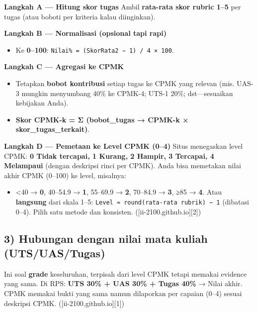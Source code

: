 \documentclass[
  letterpaper,
  DIV=11,
  numbers=noendperiod]{scrreprt}
\providecommand{\tightlist}{%
  \setlength{\itemsep}{0pt}\setlength{\parskip}{0pt}}
\begin{document}
\textbf{Langkah A --- Hitung skor tugas} Ambil \textbf{rata-rata skor
rubric 1--5} per tugas (atau boboti per kriteria kalau diinginkan).

\textbf{Langkah B --- Normalisasi (opsional tapi rapi)}

\begin{itemize}
\tightlist
\item
  Ke \textbf{0--100}:
  \texttt{Nilai\%\ =\ (SkorRata2\ −\ 1)\ /\ 4\ ×\ 100}.
\end{itemize}

\textbf{Langkah C --- Agregasi ke CPMK}

\begin{itemize}
\tightlist
\item
  Tetapkan \textbf{bobot kontribusi} setiap tugas ke CPMK yang relevan
  (mis. UAS-3 mungkin menyumbang 40\% ke CPMK-4; UTS-1 20\%;
  dst---sesuaikan kebijakan Anda).
\item
  \textbf{Skor CPMK-k = Σ (bobot\_tugas → CPMK-k ×
  skor\_tugas\_terkait)}.
\end{itemize}

\textbf{Langkah D --- Pemetaan ke Level CPMK (0--4)} Situs menegaskan
level CPMK: \textbf{0 Tidak tercapai, 1 Kurang, 2 Hampir, 3 Tercapai, 4
Melampaui} (dengan deskripsi rinci per CPMK). Anda bisa memetakan nilai
akhir CPMK (0--100) ke level, misalnya:

\begin{itemize}
\tightlist
\item
  \textless40 → \textbf{0}, 40--54.9 → \textbf{1}, 55--69.9 →
  \textbf{2}, 70--84.9 → \textbf{3}, ≥85 → \textbf{4}. Atau
  \textbf{langsung} dari skala 1--5:
  \texttt{Level\ ≈\ round(rata-rata\ rubrik)\ −\ 1} (dibatasi 0--4).
  Pilih satu metode dan konsisten. ({[}ii-2100.github.io{]}{[}2{]})
\end{itemize}

\subsection*{\texorpdfstring{3) Hubungan dengan \textbf{nilai mata
kuliah}
(UTS/UAS/Tugas)}{3) Hubungan dengan nilai mata kuliah (UTS/UAS/Tugas)}}\label{hubungan-dengan-nilai-mata-kuliah-utsuastugas}

Ini soal \textbf{grade} keseluruhan, terpisah dari level CPMK tetapi
memakai evidence yang sama. Di RPS: \textbf{UTS 30\% + UAS 30\% + Tugas
40\%} → Nilai akhir. CPMK memakai bukti yang sama namun dilaporkan per
capaian (0--4) sesuai deskripsi CPMK. ({[}ii-2100.github.io{]}{[}1{]})
\end{document}
